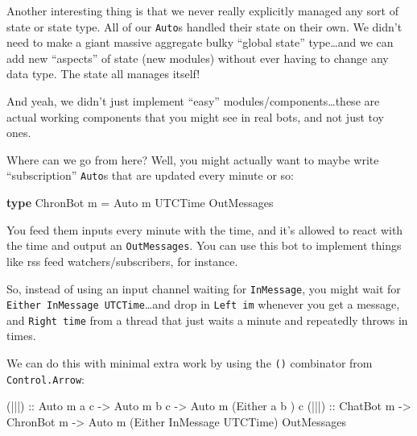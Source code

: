 \documentclass[]{article}
\newenvironment{Shaded}{}{}
\newcommand{\DataTypeTok}[1]{\textcolor[rgb]{0.56,0.13,0.00}{#1}}
\newcommand{\KeywordTok}[1]{\textcolor[rgb]{0.00,0.44,0.13}{\textbf{#1}}}
\newcommand{\NormalTok}[1]{#1}
\newcommand{\OtherTok}[1]{\textcolor[rgb]{0.00,0.44,0.13}{#1}}
\begin{document}
Another interesting thing is that we never really explicitly managed any sort of
state or state type. All of our \texttt{Auto}s handled their state on their own.
We didn't need to make a giant massive aggregate bulky ``global state''
type\ldots and we can add new ``aspects'' of state (new modules) without ever
having to change any data type. The state all manages itself!

And yeah, we didn't just implement ``easy'' modules/components\ldots these are
actual working components that you might see in real bots, and not just toy
ones.

Where can we go from here? Well, you might actually want to maybe write
``subscription'' \texttt{Auto}s that are updated every minute or so:

\begin{Shaded}
\begin{Highlighting}[]
\KeywordTok{type} \DataTypeTok{ChronBot}\NormalTok{ m }\OtherTok{=} \DataTypeTok{Auto}\NormalTok{ m }\DataTypeTok{UTCTime} \DataTypeTok{OutMessages}
\end{Highlighting}
\end{Shaded}

You feed them inputs every minute with the time, and it's allowed to react with
the time and output an \texttt{OutMessages}. You can use this bot to implement
things like rss feed watchers/subscribers, for instance.

So, instead of using an input channel waiting for \texttt{InMessage}, you might
wait for \texttt{Either\ InMessage\ UTCTime}\ldots and drop in \texttt{Left\ im}
whenever you get a message, and \texttt{Right\ time} from a thread that just
waits a minute and repeatedly throws in times.

We can do this with minimal extra work by using the
\texttt{(\textbar{}\textbar{}\textbar{})} combinator from
\texttt{Control.Arrow}:

\begin{Shaded}
\begin{Highlighting}[]
\OtherTok{(|||) ::} \DataTypeTok{Auto}\NormalTok{ m a c }\OtherTok{{-}\textgreater{}} \DataTypeTok{Auto}\NormalTok{ m b c }\OtherTok{{-}\textgreater{}} \DataTypeTok{Auto}\NormalTok{ m (}\DataTypeTok{Either}\NormalTok{ a         b      ) c}
\OtherTok{(|||) ::} \DataTypeTok{ChatBot}\NormalTok{ m  }\OtherTok{{-}\textgreater{}} \DataTypeTok{ChronBot}\NormalTok{ m }\OtherTok{{-}\textgreater{}} \DataTypeTok{Auto}\NormalTok{ m (}\DataTypeTok{Either} \DataTypeTok{InMessage} \DataTypeTok{UTCTime}\NormalTok{) }\DataTypeTok{OutMessages}
\end{Highlighting}
\end{Shaded}
\end{document}
